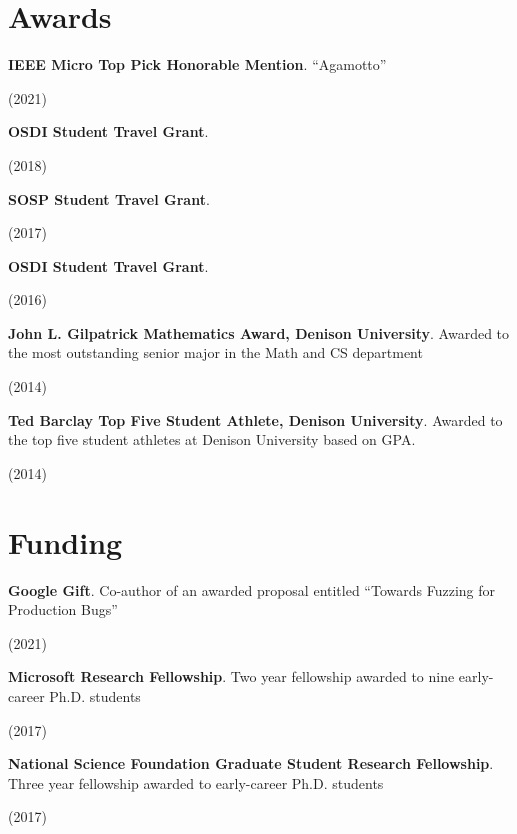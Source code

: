 \documentclass[letterpaper,10pt]{article}
\newcommand{\sidebyside}[2]{
  \begin{minipage}[t]{.75\textwidth}
    \raggedright{}
    #2
  \end{minipage}
  \hspace{.01\textwidth}
    \begin{minipage}[t]{.205\textwidth}
    \raggedleft
    #1
  \end{minipage}
}
\newcommand{\trio}[3]{\sidebyside{#3}{\textbf{#1}. #2}}
\begin{document}
\section{Awards}
\begin{smenumerate}
\item \trio{IEEE Micro Top Pick Honorable Mention}{``Agamotto''}{(2021)}
\item \trio{OSDI Student Travel Grant}{}{(2018)}
\item \trio{SOSP Student Travel Grant}{}{(2017)}
\item \trio{OSDI Student Travel Grant}{}{(2016)}
\item \trio{John L. Gilpatrick Mathematics Award, Denison University}{Awarded to
  the most outstanding senior major in the Math and CS department}{(2014)}
\item \trio{Ted Barclay Top Five Student Athlete, Denison University}{Awarded to
  the top five student athletes at Denison University based on GPA.}{(2014)}
\end{smenumerate}

\section{Funding}
\begin{smenumerate}
\item \trio{Google Gift}{Co-author of an awarded proposal entitled
  ``Towards Fuzzing for Production Bugs''}{(2021)}
\item \trio{Microsoft Research Fellowship}{Two year fellowship awarded to
  nine early-career Ph.D. students}{(2017)}
\item \trio{National Science Foundation Graduate Student Research
  Fellowship}{Three year fellowship awarded to early-career
  Ph.D. students}{(2017)}
\end{smenumerate}
\end{document}
